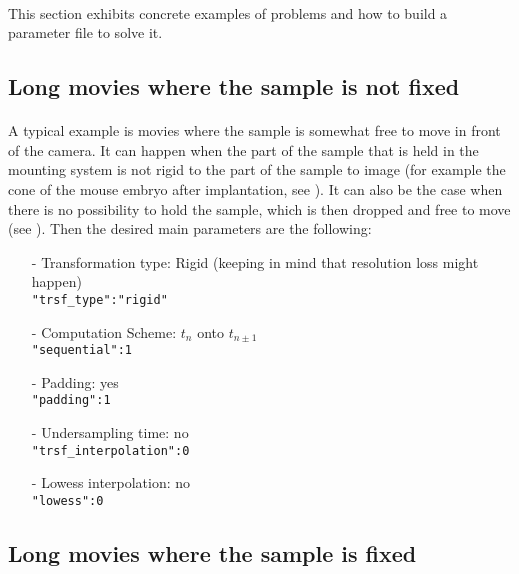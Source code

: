 \documentclass[10pt,a4paper]{book}
\begin{document}
\paragraph{}This section exhibits concrete examples of problems and how to build a parameter file to solve it.
\subsection{Long movies where the sample is not fixed}
\paragraph{}A typical example is movies where the sample is somewhat free to move in front of the camera. It can happen when the part of the sample that is held in the mounting system is not rigid to the part of the sample to image (for example the cone of the mouse embryo after implantation, see \citep{McDole:2018aa}). It can also be the case when there is no possibility to hold the sample, which is then dropped and free to move (see \citep{Guignard:2017aa}). Then the desired main parameters are the following:
	\begin{itemize}
		\item[-] Transformation type: Rigid (keeping in mind that resolution loss might happen)\\
					\texttt{"trsf\_type":"rigid"}
		\item[-] Computation Scheme: $t_n$ onto $t_{n\pm 1}$\\
					\texttt{"sequential":1}
		\item[-] Padding: yes\\
					\texttt{"padding":1}
		\item[-] Undersampling time: no\\
					\texttt{"trsf\_interpolation":0}
		\item[-] Lowess interpolation: no\\
					\texttt{"lowess":0}
	\end{itemize}
\subsection{Long movies where the sample is fixed}
\end{document}

